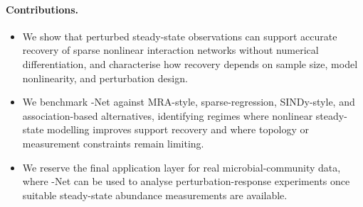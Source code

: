 \paragraph{Contributions.}
\begin{itemize}
  \item We show that perturbed steady-state observations can support accurate recovery
        of sparse nonlinear interaction networks without numerical differentiation,
        and characterise how recovery depends on sample size, model nonlinearity, and
        perturbation design.
  \item We benchmark \pss{}-Net against MRA-style, sparse-regression, SINDy-style, and
        association-based alternatives, identifying regimes where nonlinear
        steady-state modelling improves support recovery and where topology or
        measurement constraints remain limiting.
  \item We reserve the final application layer for real microbial-community data, where
        \pss{}-Net can be used to analyse perturbation-response experiments once
        suitable steady-state abundance measurements are available.
\end{itemize}
